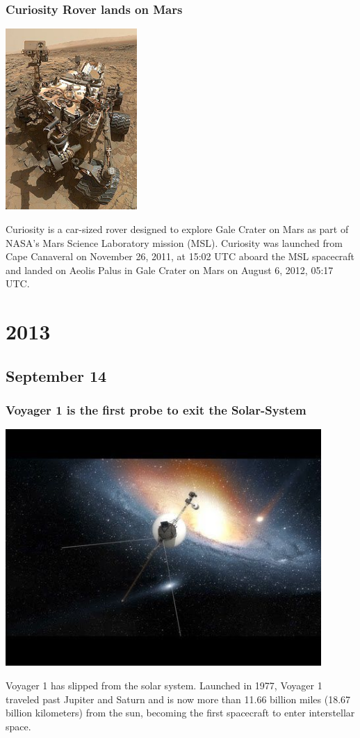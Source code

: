 \documentclass[11pt]{report}
\begin{document}
\subsection{Curiosity Rover lands on Mars}
\vspace{2mm}\begin{center}\includegraphics[width=5cm]{./img/curiosityRover.jpg}\end{center}
Curiosity is a car-sized rover designed to explore Gale Crater on Mars as part of NASA's Mars Science Laboratory mission (MSL). Curiosity was launched from Cape Canaveral on November 26, 2011, at 15:02 UTC aboard the MSL spacecraft and landed on Aeolis Palus in Gale Crater on Mars on August 6, 2012, 05:17 UTC.

\chapter{2013}
\section{September 14}
\subsection{Voyager 1 is the first probe to exit the Solar-System}
\vspace{2mm}\begin{center}\includegraphics[width=12cm]{./img/voyagerLeaving.jpg}\end{center}
Voyager 1 has slipped from the solar system. Launched in 1977, Voyager 1 traveled past Jupiter and Saturn and is now more than 11.66 billion miles (18.67 billion kilometers) from the sun, becoming the first spacecraft to enter interstellar space.
\end{document}
